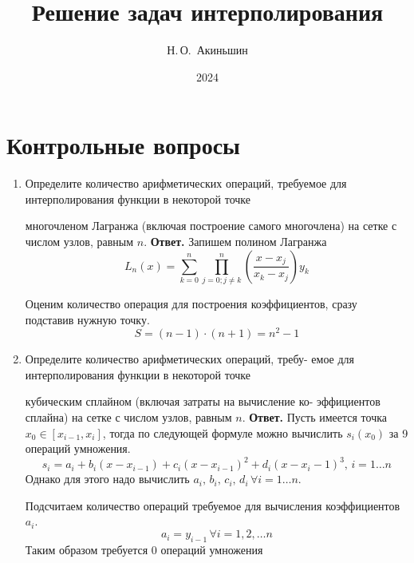 \documentclass{article}
\title{Решение задач интерполирования}
\author{Н.\,О.~Акиньшин}
\date{2024}
\begin{document}
    \maketitle
    \newpage
    \tableofcontents
    \newpage

    \section{Контрольные вопросы}
    \begin{enumerate}
        \item Определите количество арифметических операций, требуемое для интерполирования функции в некоторой точке
        
        многочленом Лагранжа (включая построение самого многочлена) на сетке с числом узлов, равным $n$.
        \newline 
        {\bfseries Ответ. } 
        Запишем полином Лагранжа
        \begin{equation*}
            L_n(x) = \sum_{k=0}^{n} \prod_{j=0; j\neq k}^{n} \left(\dfrac{x-x_j}{x_k-x_j}\right) y_k 
        \end{equation*}

        Оценим количество операция для построения коэффициентов, сразу подставив 
        нужную точку. 
        \begin{equation*}
            S = (n-1) \cdot (n+1) = n^2 - 1
        \end{equation*}

        \item  Определите количество арифметических операций, требу-
        емое для интерполирования функции в некоторой точке
        
        кубическим сплайном (включая затраты на вычисление ко-
        эффициентов сплайна) на сетке с числом узлов, равным $n$.
        \newline
        {\bfseries Ответ. } Пусть имеется точка $x_0 \in [x_{i-1}, x_{i}]$, тогда по следующей формуле можно вычислить $s_i(x_0)$ за 9 операций умножения.
        \[
        s_i=a_i+b_i(x-x_{i-1})+c_i(x-x_{i-1})^2+d_i(x-x_i-1)^3, \, i=1\ldots n
        \]
        Однако для этого надо вычислить $a_i, \, b_i, \, c_i, \, d_i \, \forall i=1 \ldots n$.
        
        
        \noindent Подсчитаем количество операций требуемое для вычисления коэффициентов $a_i$. 
        \[
        a_i=y_{i-1} \, \forall i=1,2, \ldots n
        \]
        Таким образом требуется 0 операций умножения
        

\end{enumerate}
\end{document}
